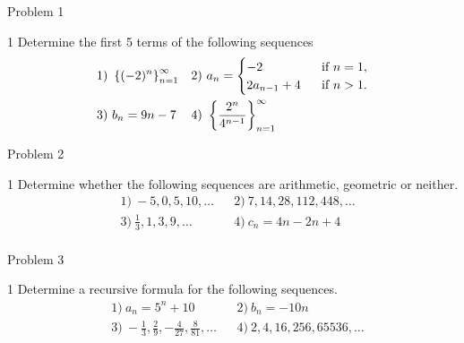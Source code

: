 
\begin{opgavetekst}{Problem 1}
\end{opgavetekst}
\begin{delopgave}{1}
	Determine the first 5 terms of the following sequences
	\begin{align*}
		&1) \ \left\{(-2)^n\right\}_{n=1}^\infty & &2) \ a_n = 
		\begin{cases}
			-2 \ &\textnormal{ if }n = 1, \\
			2a_{n-1} + 4 \ &\textnormal{ if }n > 1.
		\end{cases}
		 \\
		&3) \ b_n = 9n - 7 & &4) \ \left\{ \frac{2^n}{4^{n-1}} \right\}_{n=1}^\infty  \\
	\end{align*}
\end{delopgave}

\begin{opgavetekst}{Problem 2}
\end{opgavetekst}
\begin{delopgave}{1}
	Determine whether the following sequences are arithmetic, geometric or neither. 
	\begin{align*}
		&1) \ -5, 0, 5, 10, \hdots & &2) \ 7, 14, 28, 112, 448, \hdots \\
		&3) \ \frac{1}{3}, 1, 3, 9, \hdots  & &4) \ c_n = 4n - 2n + 4 \\	
	\end{align*}
\end{delopgave}

\begin{opgavetekst}{Problem 3}
\end{opgavetekst}
\begin{delopgave}{1}
	Determine a recursive formula for the following sequences.
	\begin{align*}
		&1) \ a_n = 5^n + 10  &  &2) \  b_n = -10n   \\
		&3) \ -\frac{1}{3}, \frac{2}{9}, -\frac{4}{27}, \frac{8}{81}, \hdots   &  &4) \ 2,4,16,256,65536, \hdots   \\	
	\end{align*}	 
\end{delopgave}

